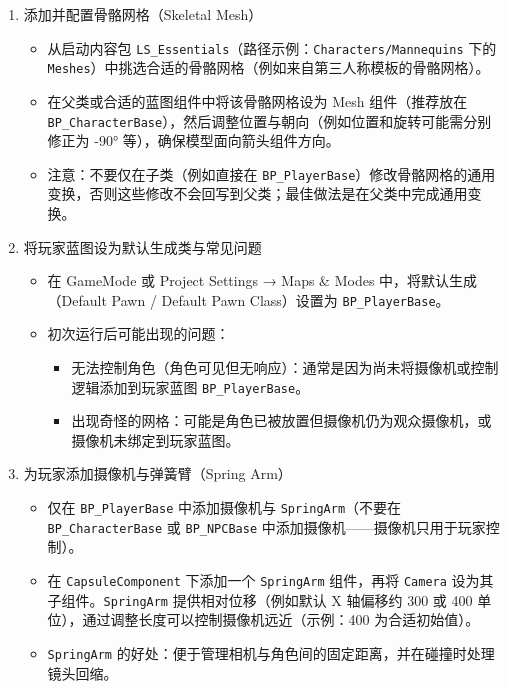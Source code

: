 \documentclass[10pt,CJKmath]{zhbook-v1}
\newcommand{\il}[1]{\texttt{#1}}%
\begin{document}
\begin{enumerate}
  \item 添加并配置骨骼网格（Skeletal Mesh）
    \begin{itemize}
      \item 从启动内容包 \il{LS_Essentials}（路径示例：\il{Characters/Mannequins} 下的 \il{Meshes}）中挑选合适的骨骼网格（例如来自第三人称模板的骨骼网格）。
      \item 在父类或合适的蓝图组件中将该骨骼网格设为 Mesh 组件（推荐放在 \il{BP_CharacterBase}），然后调整位置与朝向（例如位置和旋转可能需分别修正为 -90° 等），确保模型面向箭头组件方向。
      \item 注意：不要仅在子类（例如直接在 \il{BP_PlayerBase}）修改骨骼网格的通用变换，否则这些修改不会回写到父类；最佳做法是在父类中完成通用变换。
    \end{itemize}

  \item 将玩家蓝图设为默认生成类与常见问题
    \begin{itemize}
      \item 在 GameMode 或 Project Settings → Maps \& Modes 中，将默认生成（Default Pawn / Default Pawn Class）设置为 \il{BP_PlayerBase}。
      \item 初次运行后可能出现的问题：
        \begin{itemize}
          \item 无法控制角色（角色可见但无响应）：通常是因为尚未将摄像机或控制逻辑添加到玩家蓝图 \il{BP_PlayerBase}。
          \item 出现奇怪的网格：可能是角色已被放置但摄像机仍为观众摄像机，或摄像机未绑定到玩家蓝图。
        \end{itemize}
    \end{itemize}

  \item 为玩家添加摄像机与弹簧臂（Spring Arm）
    \begin{itemize}
      \item 仅在 \il{BP_PlayerBase} 中添加摄像机与 \il{SpringArm}（不要在 \il{BP_CharacterBase} 或 \il{BP_NPCBase} 中添加摄像机——摄像机只用于玩家控制）。
      \item 在 \il{CapsuleComponent} 下添加一个 \il{SpringArm} 组件，再将 \il{Camera} 设为其子组件。\il{SpringArm} 提供相对位移（例如默认 X 轴偏移约 300 或 400 单位），通过调整长度可以控制摄像机远近（示例：400 为合适初始值）。
      \item \il{SpringArm} 的好处：便于管理相机与角色间的固定距离，并在碰撞时处理镜头回缩。
    \end{itemize}


\end{enumerate}
\end{document}

